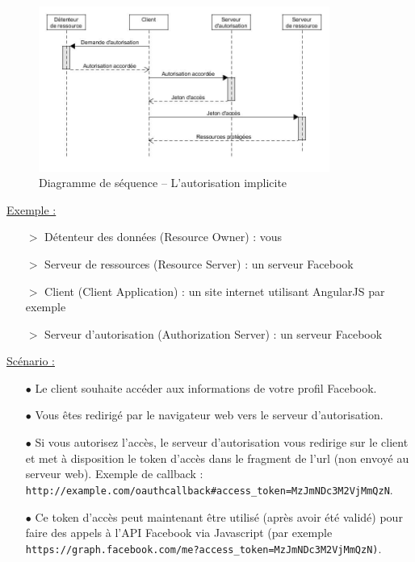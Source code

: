 \documentclass[11pt,twoside,a4paper]{article}
\begin{document}
\begin{figure}[ht]
	\includegraphics[width=0.85\textwidth]{img/implicit.jpg}
	\caption{Diagramme de s{\'e}quence -- L'autorisation implicite}
\end{figure}

\underline{Exemple :}
\begin{itemize}
	\item[$>$] D{\'e}tenteur des donn{\'e}es (Resource Owner) : vous
	\item[$>$] Serveur de ressources (Resource Server) : un serveur Facebook
	\item[$>$] Client (Client Application) : un site internet utilisant AngularJS par exemple
	\item[$>$] Serveur d'autorisation (Authorization Server) : un serveur Facebook
\end{itemize}

\underline{Sc{\'e}nario :}
\begin{itemize}
	\item[$\bullet$] Le client souhaite acc{\'e}der aux informations de votre profil Facebook.
	\item[$\bullet$] Vous {\^e}tes redirig{\'e} par le navigateur web vers le serveur d'autorisation.
	\item[$\bullet$] Si vous autorisez l'acc{\`e}s, le serveur d'autorisation vous redirige sur le client et met {\`a} disposition le token d'acc{\`e}s dans le fragment de l'url (non envoy{\'e} au serveur web). Exemple de callback : \texttt{http://example.com/oauthcallback\#access\_token=MzJmNDc3M2VjMmQzN}.
	\item[$\bullet$] Ce token d'acc{\`e}s peut maintenant {\^e}tre utilis{\'e} (apr{\`e}s avoir {\'e}t{\'e} valid{\'e}) pour faire des appels {\`a} l'API Facebook via Javascript (par exemple \texttt{https://graph.facebook.com/me?access\_token=MzJmNDc3M2VjMmQzN)}.
\end{itemize}
\end{document}
